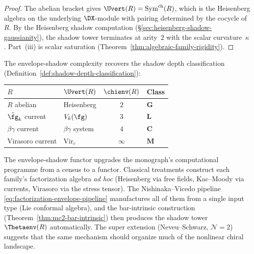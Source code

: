 \begin{proof}
The abelian bracket gives $\Uvert(R) = \mathrm{Sym}^{\mathrm{ch}}(R)$,
which is the Heisenberg algebra on the underlying $\DX$-module
with pairing determined by the cocycle of~$R$.
By the Heisenberg shadow computation
(\S\ref{sec:heisenberg-shadow-gaussianity}), the
shadow tower terminates at arity~$2$ with the scalar
curvature~$\kappa$.  Part~(iii) is scalar saturation
(Theorem~\ref{thm:algebraic-family-rigidity}).
\end{proof}

\begin{remark}
\label{rem:envelope-shadow-complexity-standard}
The envelope-shadow complexity recovers the shadow depth
classification
(Definition~\ref{def:shadow-depth-classification}):
\begin{center}
\renewcommand{\arraystretch}{1.15}
\begin{tabular}{@{}llcl@{}}
\toprule
\textbf{$R$} & \textbf{$\Uvert(R)$}
  & $\chienv(R)$ & \textbf{Class} \\
\midrule
$R$ abelian & Heisenberg & $2$ & $\mathbf{G}$ \\
$\hat{\fg}_k$ current & $V_k(\fg)$ & $3$ & $\mathbf{L}$ \\
$\beta\gamma$ current & $\beta\gamma$ system & $4$ & $\mathbf{C}$ \\
Virasoro current & $\mathrm{Vir}_c$ & $\infty$ & $\mathbf{M}$ \\
\bottomrule
\end{tabular}
\end{center}
\end{remark}

\begin{remark}
\label{rem:from-examples-to-machine}
The envelope-shadow functor upgrades the monograph's computational
programme from a census to a functor.  Classical treatments
construct each family's factorization algebra \emph{ad hoc}
(Heisenberg via free fields, Kac--Moody via currents, Virasoro
via the stress tensor).  The Nishinaka--Vicedo pipeline
\eqref{eq:factorization-envelope-pipeline} manufactures all of
them from a single input type (Lie conformal algebra), and the
bar-intrinsic construction
(Theorem~\ref{thm:mc2-bar-intrinsic}) then produces the shadow
tower $\Thetaenv(R)$ automatically.  The super extension
(Neveu--Schwarz, $\mathcal{N}=2$) suggests that the same
mechanism should organize much of the nonlinear chiral landscape.
\end{remark}

